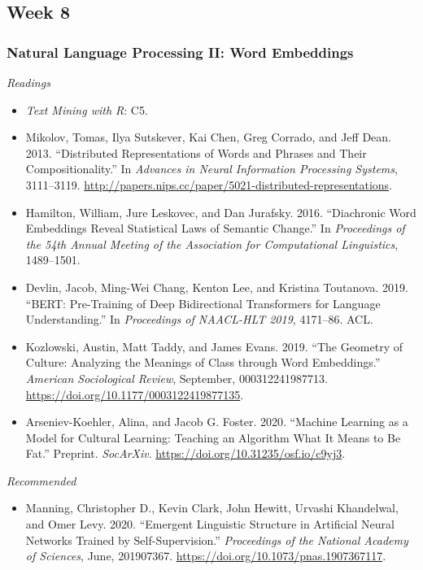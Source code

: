 \documentclass[
  10pt,
]{article}
\providecommand{\tightlist}{%
  \setlength{\itemsep}{0pt}\setlength{\parskip}{0pt}}
\begin{document}
\hypertarget{week-8}{%
\subsection{Week 8}\label{week-8}}

\hypertarget{natural-language-processing-ii-word-embeddings}{%
\subsubsection{Natural Language Processing II: Word
Embeddings}\label{natural-language-processing-ii-word-embeddings}}

\emph{Readings}

\begin{itemize}
\tightlist
\item
  \emph{Text Mining with R}: C5.
\item
  Mikolov, Tomas, Ilya Sutskever, Kai Chen, Greg Corrado, and Jeff Dean.
  2013. ``Distributed Representations of Words and Phrases and Their
  Compositionality.'' In \emph{Advances in Neural Information Processing
  Systems}, 3111--3119.
  \url{http://papers.nips.cc/paper/5021-distributed-representations}.
\item
  Hamilton, William, Jure Leskovec, and Dan Jurafsky. 2016. ``Diachronic
  Word Embeddings Reveal Statistical Laws of Semantic Change.'' In
  \emph{Proceedings of the 54th Annual Meeting of the Association for
  Computational Linguistics}, 1489--1501.
\item
  Devlin, Jacob, Ming-Wei Chang, Kenton Lee, and Kristina Toutanova.
  2019. ``BERT: Pre-Training of Deep Bidirectional Transformers for
  Language Understanding.'' In \emph{Proceedings of NAACL-HLT 2019},
  4171--86. ACL.
\item
  Kozlowski, Austin, Matt Taddy, and James Evans. 2019. ``The Geometry
  of Culture: Analyzing the Meanings of Class through Word Embeddings.''
  \emph{American Sociological Review}, September, 000312241987713.
  \url{https://doi.org/10.1177/0003122419877135}.
\item
  Arseniev-Koehler, Alina, and Jacob G. Foster. 2020. ``Machine Learning
  as a Model for Cultural Learning: Teaching an Algorithm What It Means
  to Be Fat.'' Preprint. \emph{SocArXiv}.
  \url{https://doi.org/10.31235/osf.io/c9yj3}.
\end{itemize}

\emph{Recommended}

\begin{itemize}
\tightlist
\item
  Manning, Christopher D., Kevin Clark, John Hewitt, Urvashi Khandelwal,
  and Omer Levy. 2020. ``Emergent Linguistic Structure in Artificial
  Neural Networks Trained by Self-Supervision.'' \emph{Proceedings of
  the National Academy of Sciences}, June, 201907367.
  \url{https://doi.org/10.1073/pnas.1907367117}.
\end{itemize}
\end{document}
